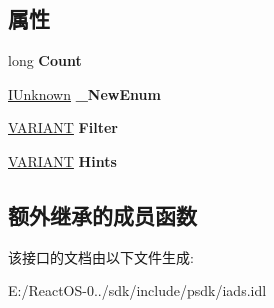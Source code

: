 \subsection*{属性}
\begin{DoxyCompactItemize}
\item 
\mbox{\label{interface_i_a_ds_container_aa2a821f235a2e6d63f276cf9f956bf69}} 
long {\bfseries Count}
\item 
\mbox{\label{interface_i_a_ds_container_a30ee7bf662441756eaf7c06737d5d237}} 
\hyperlink{interface_i_unknown}{I\+Unknown} {\bfseries \+\_\+\+New\+Enum}
\item 
\mbox{\label{interface_i_a_ds_container_abcf0fe1a6300367845c88e41f2951ef5}} 
\hyperlink{structtag_v_a_r_i_a_n_t}{V\+A\+R\+I\+A\+NT} {\bfseries Filter}
\item 
\mbox{\label{interface_i_a_ds_container_a1dd849b174e183affaa344b4c70cd704}} 
\hyperlink{structtag_v_a_r_i_a_n_t}{V\+A\+R\+I\+A\+NT} {\bfseries Hints}
\end{DoxyCompactItemize}
\subsection*{额外继承的成员函数}


该接口的文档由以下文件生成\+:\begin{DoxyCompactItemize}
\item 
E\+:/\+React\+O\+S-\/0../sdk/include/psdk/iads.\+idl\end{DoxyCompactItemize}
